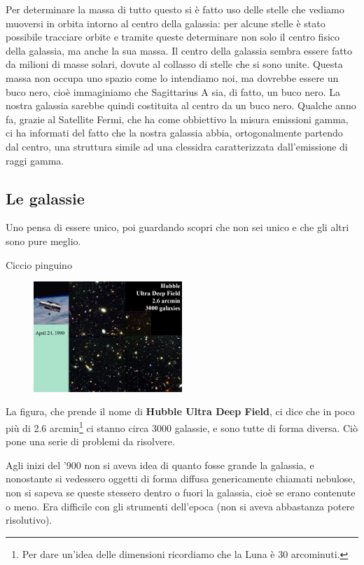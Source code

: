 Per determinare la massa di tutto questo si è fatto uso delle stelle che vediamo muoversi in orbita intorno al centro della galassia: per alcune stelle è stato possibile tracciare orbite e tramite queste determinare non solo il centro fisico della galassia, ma anche la sua massa. Il centro della galassia sembra essere fatto da milioni di masse solari, dovute al collasso di stelle che si sono unite. Questa massa non occupa uno spazio come lo intendiamo noi, ma dovrebbe essere un buco nero, cioè immaginiamo che Sagittarius A sia, di fatto, un buco nero. La nostra galassia sarebbe quindi costituita al centro da un buco nero. Qualche anno fa, grazie al Satellite Fermi, che ha come obbiettivo la misura emissioni gamma, ci ha informati del fatto che la nostra galassia abbia, ortogonalmente partendo dal centro, una struttura simile ad una clessidra caratterizzata dall'emissione di raggi gamma.

\subsection{Le galassie}

\epigraph{Uno pensa di essere unico, poi guardando scopri che non sei unico e che gli altri sono pure meglio.}{Ciccio pinguino}

\begin{figure}[H]
    \centering
    \includegraphics[width=0.5\textwidth]{immagini_lezioni12-12/hubble ultra deep field.png}
\end{figure}

La figura, che prende il nome di \textbf{Hubble Ultra Deep Field}, ci dice che in poco più di 2.6 arcmin\footnote{Per dare un'idea delle dimensioni ricordiamo che la Luna è 30 arcominuti.} ci stanno circa 3000 galassie, e sono tutte di forma diversa. Ciò pone una serie di problemi da risolvere.

Agli inizi del '900 non si aveva idea di quanto fosse grande la galassia, e nonostante si vedessero oggetti di forma diffusa genericamente chiamati nebulose, non si sapeva se queste stessero dentro o fuori la galassia, cioè se erano contenute o meno. Era difficile con gli strumenti dell'epoca (non si aveva abbastanza potere risolutivo).

